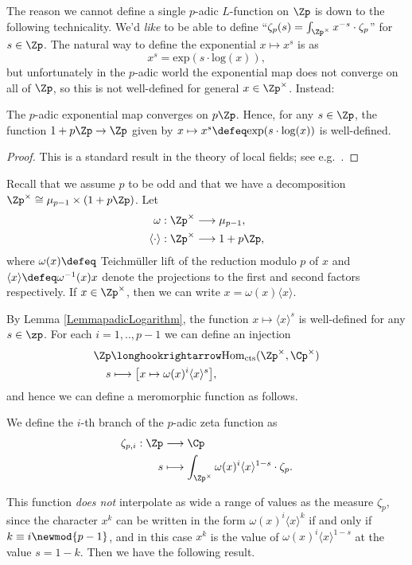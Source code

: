 \documentclass[a4paper,10pt, english, reqno]{smfart}
\numberwithin{equation}{section}
\begin{document}
The reason we cannot define a single $p$-adic $L$-function on $\Zp$ is down to the following technicality. We'd \emph{like} to be able to define ``$\zeta_p(s) = \int_{\Zp^\times}x^{-s}\cdot\zeta_p$'' for $s\in\Zp$. The natural way to define the exponential $x \mapsto x^s$ is as
\[x^s = \mathrm{exp}(s\cdot\mathrm{log}(x)),\]
but unfortunately in the $p$-adic world the exponential map does not converge on all of $\Zp$, so this is not well-defined for general $x\in\Zp^\times$. Instead:

\begin{lemma} \label{LemmapadicLogarithm}
The $p$-adic exponential map converges on $p\Zp$. Hence, for any $s \in \Zp$, the function $1+p\Zp \rightarrow \Zp$ given by $x \mapsto x^s \defeq \mathrm{\exp}(s\cdot\mathrm{log}(x))$ is well-defined.
\end{lemma}
\begin{proof}
This is a standard result in the theory of local fields; see e.g.\ \cite[\S12]{cassels}.
\end{proof}

\begin{definition}
Recall that we assume $p$ to be odd and that we have a decomposition $\Zp^\times \cong \mu_{p  - 1} \times (1+p\Zp)$. Let
\begin{align*}\omega : \Zp^\times &\longrightarrow \mu_{p - 1},\\
\langle\cdot\rangle : \Zp^\times &\longrightarrow 1+p\Zp,
\end{align*}
where $\omega(x) \defeq $ Teichm\"uller lift of the reduction modulo $p$ of $x$ and $\langle x \rangle \defeq \omega^{-1}(x) x$ denote the projections to the first and second factors respectively. If $x\in\Zp^\times$, then we can write $x = \omega(x)\langle x\rangle$.
\end{definition}

By Lemma \ref{LemmapadicLogarithm}, the function $x \mapsto \langle x\rangle^s$ is well-defined for any $s \in \zp$. For each $i = 1,..,p-1$ we can define an injection
\begin{align*}\Zp &\longhookrightarrow \mathrm{Hom}_{\mathrm{cts}}(\Zp^\times,\Cp^\times)\\
s &\longmapsto \big[x \mapsto \omega(x)^i \langle x\rangle^s\big],
\end{align*}
and hence we can define  a meromorphic function as follows.
\begin{definition} \label{DefpadicZeta}
 We define the $i$-th branch of the $p$-adic zeta function as
\begin{align*}
\zeta_{p,i} : \Zp &\longrightarrow \Cp\\
s &\longmapsto \int_{\Zp^\times}\omega(x)^{i}\langle x\rangle^{1-s} \cdot\zeta_p.
\end{align*}
\end{definition}
This function \emph{does not} interpolate as wide a range of values as the measure $\zeta_p$, since the character $x^k$ can be written in the form $\omega(x)^i\langle x\rangle^k$ if and only if $k \equiv i \newmod{p-1}$, and in this case $x^k$ is the value of $\omega(x)^{i}\langle x \rangle^{1-s}$ at the value $s = 1-k$. Then we have the following result.
\end{document}
